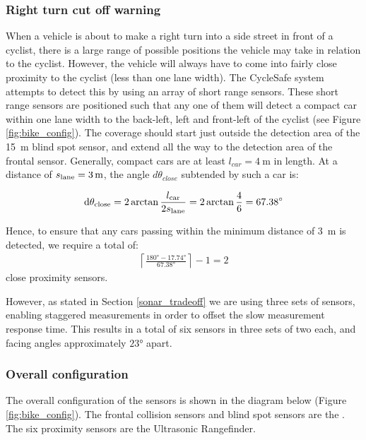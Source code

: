 \documentclass[journal]{IEEEtran}
\begin{document}
\subsubsection{Right turn cut off warning}
When a vehicle is about to make a right turn into a side street in front of a cyclist, there is a large range of possible positions the vehicle may take in relation to the cyclist. However, the vehicle will always have to come into fairly close proximity to the cyclist (less than one lane width). The CycleSafe system attempts to detect this by using an array of short range sensors. These short range sensors are positioned such that any one of them will detect a compact car within one lane width to the back-left, left and front-left of the cyclist (see Figure \ref{fig:bike_config}). The coverage should start just outside the detection area of the \SI{15}{\meter} blind spot sensor, and extend all the way to the detection area of the frontal sensor. Generally, compact cars are at least $l_{car} = \SI{4}{\meter}$ in length. At a distance of $s_\text{lane} = \SI{3}{\meter}$, the angle $d\theta_{close}$ subtended by such a car is:

\begin{align}
\dd{\theta_\text{close}} = 2\arctan{\frac{l_\text{car}}{2s_\text{lane}}} = 2\arctan{\frac{4}{6}} = \ang{67.38}
\end{align}

Hence, to ensure that any cars passing within the minimum distance of \SI{3}{\meter} is detected, we require a total of:
\begin{align}
    \left\lceil \frac{ \ang{180} - \ang{17.74} }{ \ang{67.38} } \right\rceil - 1 = 2
\end{align}
close proximity sensors.

However, as stated in Section \ref{sonar_tradeoff} we are using three sets of sensors, enabling staggered measurements in order to offset the slow measurement response time. This results in a total of six sensors in three sets of two each, and facing angles approximately $\ang{23}$ apart.

\subsubsection{Overall configuration}
The overall configuration of the sensors is shown in the diagram below (Figure \ref{fig:bike_config}). The frontal collision sensors and blind spot sensors are the \lidar{}. The six proximity sensors are the \sonar{} Ultrasonic Rangefinder.
\end{document}
